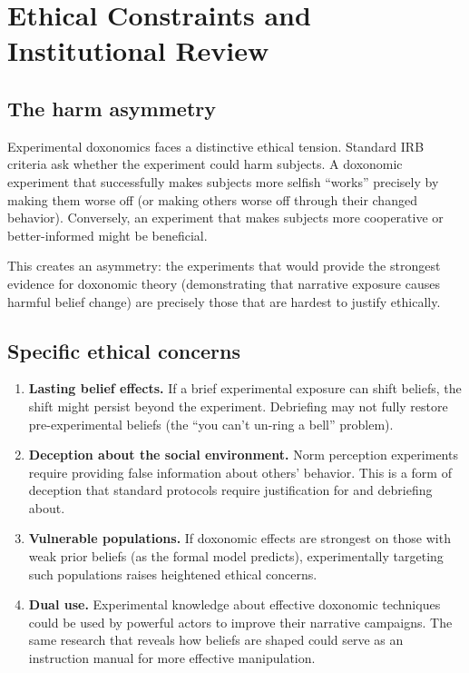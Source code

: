 \section{Ethical Constraints and Institutional Review}
\label{sec:ch19-ethics}

\subsection{The harm asymmetry}

Experimental doxonomics faces a distinctive ethical tension.
Standard IRB criteria ask whether the experiment could harm subjects.
A doxonomic experiment that successfully makes subjects more selfish ``works'' precisely by making them worse off (or making others worse off through their changed behavior).
Conversely, an experiment that makes subjects more cooperative or better-informed might be beneficial.

This creates an asymmetry: the experiments that would provide the strongest evidence for doxonomic theory (demonstrating that narrative exposure causes harmful belief change) are precisely those that are hardest to justify ethically.

\subsection{Specific ethical concerns}

\begin{enumerate}
  \item \textbf{Lasting belief effects.}
  If a brief experimental exposure can shift beliefs, the shift might persist beyond the experiment.
  Debriefing may not fully restore pre-experimental beliefs (the ``you can't un-ring a bell'' problem).

  \item \textbf{Deception about the social environment.}
  Norm perception experiments require providing false information about others' behavior.
  This is a form of deception that standard protocols require justification for and debriefing about.

  \item \textbf{Vulnerable populations.}
  If doxonomic effects are strongest on those with weak prior beliefs (as the formal model predicts), experimentally targeting such populations raises heightened ethical concerns.

  \item \textbf{Dual use.}
  Experimental knowledge about effective doxonomic techniques could be used by powerful actors to improve their narrative campaigns.
  The same research that reveals how beliefs are shaped could serve as an instruction manual for more effective manipulation.
\end{enumerate}

